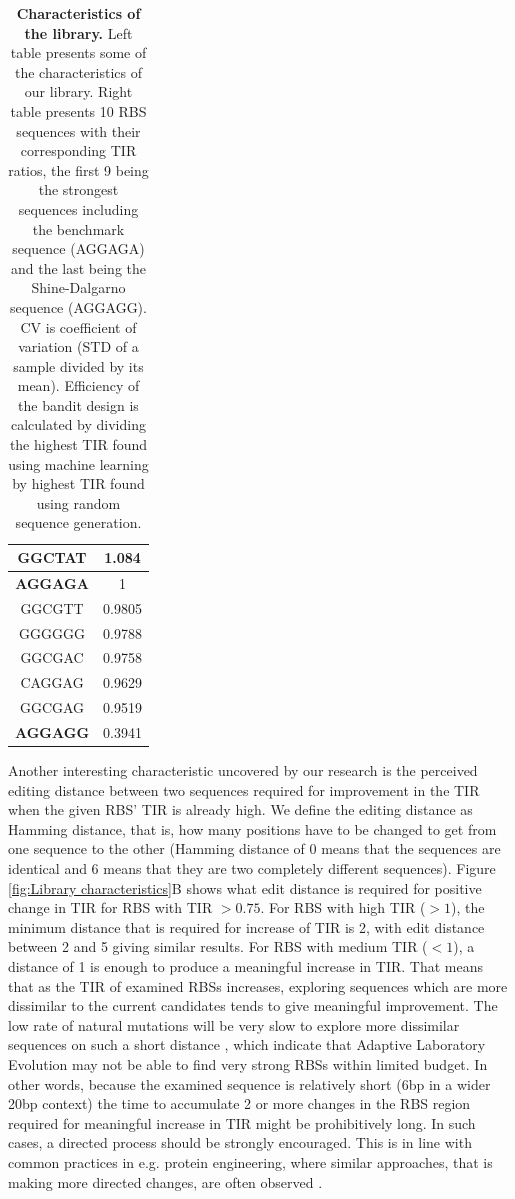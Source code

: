 \documentclass{article}
\begin{document}
\begin{table}[!h]
\begin{minipage}[c]{0.38\textwidth}
\begin{tabular}{|c|c|}
GGCTAT                & 1.084              \\ \hline
\textbf{AGGAGA}                & 1                  \\ \hline
GGCGTT                & 0.9805             \\ \hline
GGGGGG                & 0.9788             \\ \hline
GGCGAC                & 0.9758             \\ \hline
CAGGAG                & 0.9629             \\ \hline
GGCGAG                & 0.9519             \\ \hline
\textbf{AGGAGG}                & 0.3941             \\ \hline
\end{tabular}
\end{minipage}
\caption{\textbf{Characteristics of the library.}
Left table presents some of the characteristics of our library.
Right table presents 10 RBS sequences with their corresponding TIR ratios, the first 9 being the strongest sequences including the benchmark sequence (AGGAGA) and the last being the Shine-Dalgarno sequence (AGGAGG).
CV is coefficient of variation (STD of a sample divided by its mean).
Efficiency of the bandit design is calculated by dividing the highest TIR found using machine learning by highest TIR found using random sequence generation. }
\end{table}

Another interesting characteristic uncovered by our research is the perceived editing distance between two sequences required for  improvement in the TIR when the given RBS' TIR is already high. 
We define the editing distance as Hamming distance, that is, how many positions have to be changed to get from one sequence to the other (Hamming distance of 0 means that the sequences are identical and 6 means that they are two completely different sequences).
Figure \ref{fig:Library characteristics}B shows what edit distance is required for positive change in TIR for RBS with TIR $>0.75$.
For RBS with high TIR ($>1$), the minimum distance that is required for increase of TIR is 2, with edit distance between 2 and 5 giving similar results.
For RBS with medium TIR ($<1$), a distance of 1 is enough to produce a meaningful increase in TIR.
That means that as the TIR of examined RBSs increases, exploring sequences which are more dissimilar to the current candidates tends to give meaningful improvement. 
The low rate of natural mutations will be very slow to explore more dissimilar sequences on such a short distance \cite{Lee2012},
which indicate that Adaptive Laboratory Evolution may not be able to find very strong RBSs within limited budget.  
In other words, because the examined sequence is relatively short (6bp in a wider 20bp context) the time to accumulate 2 or more changes in the RBS region required for meaningful increase in TIR might be prohibitively long.
In such cases, a directed process should be strongly encouraged.
This is in line with common practices in e.g. protein engineering, where similar approaches, that is making more directed changes, are often observed \cite{Jackel2008}.
\end{document}
